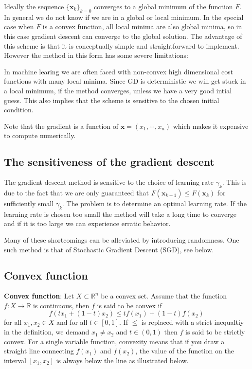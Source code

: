 \documentclass[%
oneside,                 %
final,                   %
10pt]{article}
\begin{document}
Ideally the sequence $\{\mathbf{x}_k \}_{k=0}$ converges to a global
minimum of the function $F$. In general we do not know if we are in a
global or local minimum. In the special case when $F$ is a convex
function, all local minima are also global minima, so in this case
gradient descent can converge to the global solution. The advantage of
this scheme is that it is conceptually simple and straightforward to
implement. However the method in this form has some severe
limitations:

In machine learing we are often faced with non-convex high dimensional
cost functions with many local minima. Since GD is deterministic we
will get stuck in a local minimum, if the method converges, unless we
have a very good intial guess. This also implies that the scheme is
sensitive to the chosen initial condition.

Note that the gradient is a function of $\mathbf{x} =
(x_1,\cdots,x_n)$ which makes it expensive to compute numerically.

\subsection*{The sensitiveness of the gradient descent}

The gradient descent method 
is sensitive to the choice of learning rate $\gamma_k$. This is due
to the fact that we are only guaranteed that $F(\mathbf{x}_{k+1}) \leq
F(\mathbf{x}_k)$ for sufficiently small $\gamma_k$. The problem is to
determine an optimal learning rate. If the learning rate is chosen too
small the method will take a long time to converge and if it is too
large we can experience erratic behavior.

Many of these shortcomings can be alleviated by introducing
randomness. One such method is that of Stochastic Gradient Descent
(SGD), see below.

\subsection*{Convex function}

\textbf{Convex function}: Let $X \subset \mathbb{R}^n$ be a convex set. Assume that the function $f: X \rightarrow \mathbb{R}$ is continuous, then $f$ is said to be convex if $$f(tx_1 + (1-t)x_2) \leq tf(x_1) + (1-t)f(x_2) $$ for all $x_1, x_2 \in X$ and for all $t \in [0,1]$. If $\leq$ is replaced with a strict inequaltiy in the definition, we demand $x_1 \neq x_2$ and $t\in(0,1)$ then $f$ is said to be strictly convex. For a single variable function, convexity means that if you draw a straight line connecting $f(x_1)$ and $f(x_2)$, the value of the function on the interval $[x_1,x_2]$ is always below the line as illustrated below.
\end{document}
